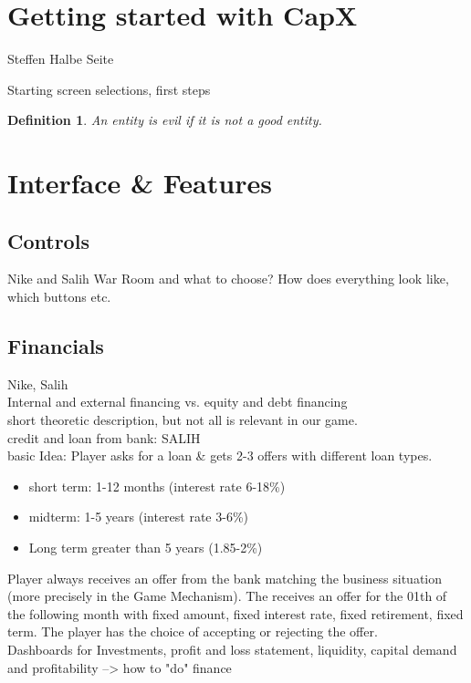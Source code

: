 \documentclass[11pt,titlepage,oneside,openany]{book}
\newtheorem{definition}{Definition}
\begin{document}
\section{Getting started with CapX}
Steffen
Halbe Seite

\label{sec:prelim}
Starting screen selections, first steps
\begin{definition}
\label{def:evil}
An entity is evil if it is not a good entity.
\end{definition}

\section{Interface \& Features}
\label{sec:good}

\subsection{Controls}  
Nike and Salih
War Room and what to choose? How does everything look like, which buttons etc.
\subsection{Financials}
Nike, Salih\\
Internal and external financing vs. equity and debt financing\\ short theoretic description, but not all is relevant in our game. \\
credit and loan from bank: SALIH \\
basic Idea: Player asks for a loan \& gets 2-3 offers with different loan types. 
\begin{itemize}
    \item short term: 1-12 months (interest rate 6-18\%)
    \item midterm: 1-5 years (interest rate 3-6\%)
    \item Long term greater than 5 years (1.85-2\%)
\end{itemize}
Player always receives an offer from the bank matching the business situation (more precisely in the Game Mechanism). The receives an offer for the 01th of the following month with fixed amount, fixed interest rate, fixed retirement, fixed term.
The player has the choice of accepting or rejecting the offer.\\

Dashboards for Investments, profit and loss statement, liquidity, capital demand and profitability --> how to "do" finance \\
\end{document}
